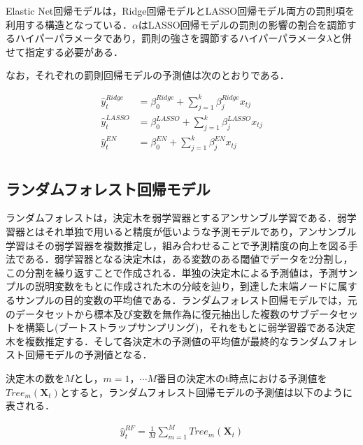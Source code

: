 \documentclass[a4paper，12pt]{jsarticle}
\begin{document}
Elastic Net回帰モデルは，Ridge回帰モデルとLASSO回帰モデル両方の罰則項を利用する構造となっている．$\alpha$はLASSO回帰モデルの罰則の影響の割合を調節するハイパーパラメータであり，罰則の強さを調節するハイパーパラメータ$\lambda$と併せて指定する必要がある．

なお，それぞれの罰則回帰モデルの予測値は次のとおりである．

\begin{equation}
  \begin{split}
    \hat{y}_t^{Ridge} &= \beta_0^{Ridge} + \sum_{j=1}^{k} \beta_{j}^{Ridge} x_{tj} \\
    \hat{y}_t^{LASSO} &= \beta_0^{LASSO} + \sum_{j=1}^{k} \beta_{j}^{LASSO} x_{tj} \\
    \hat{y}_t^{EN} &= \beta_0^{EN} + \sum_{j=1}^{k} \beta_{j}^{EN} x_{tj} \\
  \end{split}
\end{equation}

\subsection{ランダムフォレスト回帰モデル}

ランダムフォレスト\citep{breiman2001random}は，決定木を弱学習器とするアンサンブル学習である．弱学習器とはそれ単独で用いると精度が低いような予測モデルであり，アンサンブル学習はその弱学習器を複数推定し，組み合わせることで予測精度の向上を図る手法である．弱学習器となる決定木は，ある変数のある閾値でデータを2分割し，この分割を繰り返すことで作成される．単独の決定木による予測値は，予測サンプルの説明変数をもとに作成された木の分岐を辿り，到達した末端ノードに属するサンプルの目的変数の平均値である．ランダムフォレスト回帰モデルでは，元のデータセットから標本及び変数を無作為に復元抽出した複数のサブデータセットを構築し(ブートストラップサンプリング)，それをもとに弱学習器である決定木を複数推定する．そして各決定木の予測値の平均値が最終的なランダムフォレスト回帰モデルの予測値となる．


決定木の数を$M$とし，$m=1，\cdots M$番目の決定木のt時点における予測値を$\textit{Tree}_m(\bm{X}_t)$とすると，ランダムフォレスト回帰モデルの予測値は以下のように表される．

\begin{equation}
  \begin{split}
    \hat{y}_t^{RF} = \frac{1}{M} \sum_{m=1}^{M} \textit{Tree}_m(\bm{X}_t)
  \end{split}
\end{equation}
\end{document}
